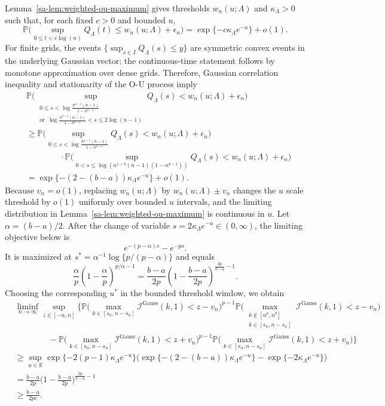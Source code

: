 \documentclass[10pt]{article}
\def\P{\mathbb{P}}
\def\reals{\mathbb{R}}
\def\I{\mathscr{I}}
\theoremstyle{definition}
\theoremstyle{remark}
\begin{document}
Lemma~\ref{sa-lem:weighted-ou-maximum} gives thresholds $w_n(u;\Lambda)$ and
$\kappa_\Lambda>0$ such that, for each fixed $c>0$ and bounded $u$,
\[
    \P \bigg(\sup_{0 \leq t < c \log (n)} Q_\Lambda(t)
    \leq
    w_n(u;\Lambda) + \epsilon_n
    \bigg)
    =
    \exp\{-c\kappa_\Lambda e^{-u}\}+o(1).
\]
For finite grids, the events $\{\sup_{s\in I}Q_\Lambda(s)\leq y\}$ are symmetric convex events in the underlying Gaussian vector; the continuous-time statement follows by monotone approximation over dense grids. Therefore, Gaussian correlation inequality \citep[Remark 3 (i)]{latala2017royen} and stationarity of the O-U process imply
\begin{align*} 
    & \mathbb{P}\bigg(\sup_{\substack{0 \leq s < \log\frac{n^{a-1}(n-1)}{1-n^{a-1}}\\
    \text{or }\ \log\frac{n^{b-1}(n-1)}{1-n^{b-1}} < s \leq 2\log(n-1)}} Q_\Lambda(s) < w_n(u;\Lambda)+\epsilon_n\bigg) \\
    & \geq
    \mathbb{P}\bigg(\sup_{0 \leq s < \log\frac{n^{a-1}(n-1)}{1-n^{a-1}}} Q_\Lambda(s) < w_n(u;\Lambda)+\epsilon_n \bigg)\\
    & \qquad \qquad \cdot \mathbb{P}\bigg(\sup_{0  < s \leq \log(n^{1-b}(n-1)(1-n^{b-1}))} Q_\Lambda(s) < w_n(u;\Lambda)+\epsilon_n \bigg) \\
    & = \exp\{-(2-(b-a))\kappa_\Lambda e^{-u}\} + o(1).
\end{align*}
Because $v_n=o(1)$, replacing $w_n(u;\Lambda)$ by $w_n(u;\Lambda)\pm v_n$ changes the $u$ scale threshold by $o(1)$ uniformly over bounded $u$ intervals, and the limiting distribution in Lemma~\ref{sa-lem:weighted-ou-maximum} is continuous in $u$. Let $\alpha=(b-a)/2$. After the change of variable $s=2\kappa_\Lambda e^{-u}\in(0,\infty)$, the limiting objective below is
\[
    e^{-(p-\alpha)s}-e^{-ps}.
\]
It is maximized at $s^\ast=\alpha^{-1}\log\{p/(p-\alpha)\}$ and equals
\[
    \frac{\alpha}{p}\left(1-\frac{\alpha}{p}\right)^{p/\alpha-1}
    =
    \frac{b-a}{2p}\left(1-\frac{b-a}{2p}\right)^{\frac{2p}{b-a}-1}.
\]
Choosing the corresponding $u^\ast$ in the bounded threshold window, we obtain
\begin{align*}
    & \liminf_{n\to\infty}\sup_{z \in [-n, n]}\Bigg\{\mathbb{P}\Big(\max_{k \in [s_n, n - s_n]}\I^{\text{Gauss}}(k,1) < z - v_n \Big)^{p-1} \P \Big( \max_{\substack{k \notin [n^a,n^b] \\ k \in [s_n, n - s_n]}} \I^{\text{Gauss}}(k,1) < z - v_n\Big) \\
    & \qquad \qquad - \mathbb{P}\Big(\max_{k \in [s_n, n - s_n]}\I^{\text{Gauss}}(k,1) < z + v_n \Big)^{p-1} \P \Big(\max_{k \in [s_n, n - s_n]} \I^{\text{Gauss}}(k,1) < z + v_n\Big)\Bigg\} \\
    & \geq \sup_{u\in\reals} \exp\{-2(p-1)\kappa_\Lambda e^{-u}\}\Big( \exp\{-(2-(b-a))\kappa_\Lambda e^{-u}\} - \exp\{-2\kappa_\Lambda e^{-u}\}\Big) \\
    & =  \frac{b-a}{2p}\bigg(1-\frac{b-a}{2p}\bigg)^{\frac{2p}{b-a}-1} \\ & \geq \frac{b-a}{2pe}.
\end{align*}
\end{document}
